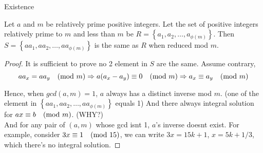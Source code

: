 \mynewpage
\begin{example}[exp:]{}

\end{example}

\begin{mysubsection}{Existence}
    \begin{theorem}[thm:]{}
        Let $a$ and $m$ be relatively prime positive integers. Let the set of positive integers relatively prime to $m$ and less than $m$ be $R=\left\{a_1,a_2,\dots,a_{\phi (m)}\right\}$. Then $S=\left\{aa_1,aa_2,\dots,aa_{\phi (m)}\right\}$ is the same as $R$ when reduced mod $m$.
    \end{theorem}

    \begin{proof}
        It is sufficient to prove no 2 element in $S$ are the same. Assume contrary,
        \begin{equation*}
            aa_x=aa_y\quad (\textnormal{mod }m)\Rightarrow a(a_x-a_y)\equiv 0\quad (\textnormal{mod }m)\Rightarrow a_x\equiv a_y\quad (\textnormal{mod }m)
        \end{equation*}

        Hence, when $gcd(a,m)=1$, $a$ always has a distinct inverse mod $m$. (one of the element in $\left\{aa_1,aa_2,\dots,aa_{\phi (m)}\right\}$ equals 1) And there always integral solution for $ax\equiv b\quad (\textnormal{mod }m)$. (WHY?)\\

        And for any pair of $(a,m)$ whose gcd isnt 1, $a$'s inverse doesnt exist. For example, consider $3x\equiv 1\quad (\textnormal{mod }15)$, we can write $3x=15k+1$, $x=5k+1/3$, which there's no integral solution.
    \end{proof}
\end{mysubsection}
